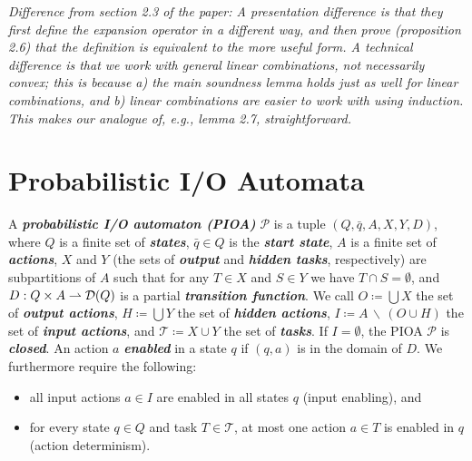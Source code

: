 \documentclass[10pt]{article}
\begin{document}
\medskip

{\small \em Difference from section 2.3 of the paper: A presentation difference is that they first define the expansion operator in a different way, and then prove (proposition 2.6) that the definition is equivalent to the more useful form. A technical difference is that we work with general linear combinations, not necessarily convex; this is because a) the main soundness lemma holds just as well for linear combinations, and b) linear combinations are easier to work with using induction. This makes our analogue of, \emph{e.g.}, lemma 2.7, straightforward.}



\section{Probabilistic I/O Automata}
\begin{definition}
A \textbf{\emph{probabilistic I/O automaton (PIOA)}} $\mathcal{P}$ is a tuple $(Q,\bar{q},A,X,Y,D)$, where $Q$ is a finite set of \textbf{\emph{states}}, $\bar{q} \in Q$ is the \emph{\textbf{start state}}, $A$ is a finite set of \emph{\textbf{actions}}, $X$ and $Y$ (the sets of \emph{\textbf{output}} and \emph{\textbf{hidden tasks}}, respectively) are subpartitions of $A$ such that for any $T \in X$ and $S \in Y$ we have $T \cap S = \emptyset$, and $D : Q \times A \rightharpoonup \mathcal{D}(Q)$ is a partial \textbf{\emph{transition function}}. We call $O \coloneqq \bigcup X$ the set of \textbf{\emph{output actions}}, $H \coloneqq \bigcup Y$ the set of \textbf{\emph{hidden actions}}, $I \coloneqq A \,\backslash \, (O \cup H)$ the set of \emph{\textbf{input actions}}, and $\mathcal{T} \coloneqq X \cup Y$ the set of \textbf{\emph{tasks}}. If $I = \emptyset$, the PIOA $\mathcal{P}$ is \emph{\textbf{closed}}. An action $a$ \textbf{\emph{enabled}} in a state $q$ if $(q,a)$ is in the domain of $D$. We furthermore require the following:
\begin{itemize}
\item all input actions $a \in I$ are enabled in all states $q$ (input enabling), and
\item for every state $q \in Q$ and task $T \in \mathcal{T}$, at most one action $a \in T$ is enabled in $q$ (action determinism).
\end{itemize}
\end{definition}
\end{document}
